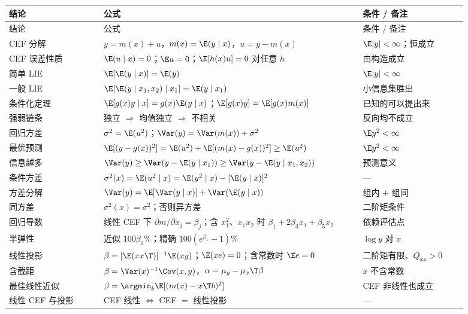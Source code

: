 {\small
\setlength{\LTpre}{4pt}\setlength{\LTpost}{4pt}
\renewcommand{\arraystretch}{1.35}
\begin{longtable}{>{\raggedright\arraybackslash}p{0.19\linewidth}>{\raggedright\arraybackslash}p{0.52\linewidth}>{\raggedright\arraybackslash}p{0.21\linewidth}}
\toprule
结论 & 公式 & 条件 / 备注\\
\midrule
\endfirsthead
\toprule
结论 & 公式 & 条件 / 备注\\
\midrule
\endhead
\bottomrule
\endfoot
CEF 分解 & $y=m(x)+u$，$m(x)=\E(y\mid x)$，$u=y-m(x)$ & $\E|y|<\infty$；恒成立\\
CEF 误差性质 & $\E(u\mid x)=0$；$\E u=0$；$\E[h(x)u]=0$ 对任意 $h$ & 由构造成立\\
简单 LIE & $\E[\E(y\mid x)]=\E(y)$ & $\E|y|<\infty$\\
一般 LIE & $\E[\E(y\mid x_1,x_2)\mid x_1]=\E(y\mid x_1)$ & 小信息集胜出\\
条件化定理 & $\E[g(x)y\mid x]=g(x)\E(y\mid x)$；$\E[g(x)y]=\E[g(x)m(x)]$ & 已知的可以提出来\\
强弱链条 & 独立 $\Rightarrow$ 均值独立 $\Rightarrow$ 不相关 & 反向均不成立\\
回归方差 & $\sigma^2=\E(u^2)$；$\Var(y)=\Var(m(x))+\sigma^2$ & $\E y^2<\infty$\\
最优预测 & $\E[(y-g(x))^2]=\E(u^2)+\E[(m(x)-g(x))^2]\ge\E(u^2)$ & $\E y^2<\infty$\\
信息越多 & $\Var(y)\ge\Var(y-\E(y\mid x_1))\ge\Var(y-\E(y\mid x_1,x_2))$ & 预测意义\\
条件方差 & $\sigma^2(x)=\E(u^2\mid x)=\E(y^2\mid x)-[\E(y\mid x)]^2$ & ---\\
方差分解 & $\Var(y)=\E[\Var(y\mid x)]+\Var(\E(y\mid x))$ & 组内 $+$ 组间\\
同方差 & $\sigma^2(x)=\sigma^2$；否则异方差 & 二阶矩条件\\
回归导数 & 线性 CEF 下 $\partial m/\partial x_j=\beta_j$；含 $x_1^2$、$x_1x_2$ 时 $\beta_1+2\beta_3x_1+\beta_5x_2$ & 依赖评估点\\
半弹性 & 近似 $100\beta_1\%$；精确 $100(e^{\beta_1}-1)\%$ & $\log y$ 对 $x$\\
线性投影 & $\beta=[\E(xx\T)]^{-1}\E(xy)$；$\E(xe)=0$；含常数时 $\E e=0$ & 二阶矩有限、$Q_{xx}>0$\\
含截距 & $\beta=\Var(x)^{-1}\Cov(x,y)$，$\alpha=\mu_y-\mu_x\T\beta$ & $x$ 不含常数\\
最佳线性近似 & $\beta=\argmin_b\E[(m(x)-x\T b)^2]$ & CEF 非线性也成立\\
线性 CEF 与投影 & CEF 线性 $\iff$ CEF $=$ 线性投影 & ---\\

\end{longtable}}
